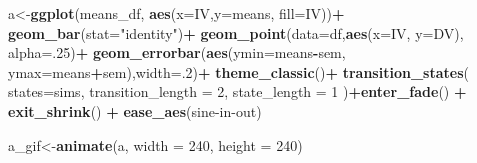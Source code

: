 \documentclass[
]{book}
\newenvironment{Shaded}{\begin{snugshade}}{\end{snugshade}}
\newcommand{\AttributeTok}[1]{\textcolor[rgb]{0.13,0.29,0.53}{#1}}
\newcommand{\DecValTok}[1]{\textcolor[rgb]{0.00,0.00,0.81}{#1}}
\newcommand{\FunctionTok}[1]{\textcolor[rgb]{0.13,0.29,0.53}{\textbf{#1}}}
\newcommand{\NormalTok}[1]{#1}
\newcommand{\OtherTok}[1]{\textcolor[rgb]{0.56,0.35,0.01}{#1}}
\newcommand{\SpecialCharTok}[1]{\textcolor[rgb]{0.81,0.36,0.00}{\textbf{#1}}}
\newcommand{\StringTok}[1]{\textcolor[rgb]{0.31,0.60,0.02}{#1}}
\begin{document}
\begin{Shaded}
\begin{Highlighting}[]
\NormalTok{a}\OtherTok{\textless{}{-}}\FunctionTok{ggplot}\NormalTok{(means\_df, }\FunctionTok{aes}\NormalTok{(}\AttributeTok{x=}\NormalTok{IV,}\AttributeTok{y=}\NormalTok{means, }\AttributeTok{fill=}\NormalTok{IV))}\SpecialCharTok{+}
  \FunctionTok{geom\_bar}\NormalTok{(}\AttributeTok{stat=}\StringTok{"identity"}\NormalTok{)}\SpecialCharTok{+}
  \FunctionTok{geom\_point}\NormalTok{(}\AttributeTok{data=}\NormalTok{df,}\FunctionTok{aes}\NormalTok{(}\AttributeTok{x=}\NormalTok{IV, }\AttributeTok{y=}\NormalTok{DV), }\AttributeTok{alpha=}\NormalTok{.}\DecValTok{25}\NormalTok{)}\SpecialCharTok{+}
  \FunctionTok{geom\_errorbar}\NormalTok{(}\FunctionTok{aes}\NormalTok{(}\AttributeTok{ymin=}\NormalTok{means}\SpecialCharTok{{-}}\NormalTok{sem, }\AttributeTok{ymax=}\NormalTok{means}\SpecialCharTok{+}\NormalTok{sem),}\AttributeTok{width=}\NormalTok{.}\DecValTok{2}\NormalTok{)}\SpecialCharTok{+}
  \FunctionTok{theme\_classic}\NormalTok{()}\SpecialCharTok{+}
  \FunctionTok{transition\_states}\NormalTok{(}
    \AttributeTok{states=}\NormalTok{sims,}
    \AttributeTok{transition\_length =} \DecValTok{2}\NormalTok{,}
    \AttributeTok{state\_length =} \DecValTok{1}
\NormalTok{  )}\SpecialCharTok{+}\FunctionTok{enter\_fade}\NormalTok{() }\SpecialCharTok{+} 
  \FunctionTok{exit\_shrink}\NormalTok{() }\SpecialCharTok{+}
  \FunctionTok{ease\_aes}\NormalTok{(}\StringTok{\textquotesingle{}sine{-}in{-}out\textquotesingle{}}\NormalTok{)}
  
\NormalTok{a\_gif}\OtherTok{\textless{}{-}}\FunctionTok{animate}\NormalTok{(a, }\AttributeTok{width =} \DecValTok{240}\NormalTok{, }\AttributeTok{height =} \DecValTok{240}\NormalTok{)}


\end{Highlighting}
\end{Shaded}
\end{document}
